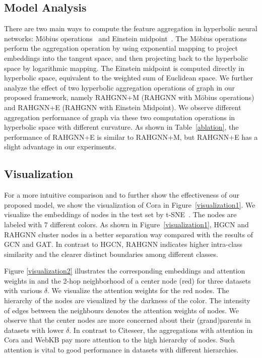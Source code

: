 \subsection{Model Analysis}
There are two main ways to compute the feature aggregation in hyperbolic neural networks: Möbius operations~\cite{HNN:GaneaBH18,HGCN_ChamiYRL19} and Einstein midpoint~\cite{HAtt}. 
The Möbius operations perform the aggregation operation by using exponential mapping to project embeddings into the tangent space, and then projecting back to the hyperbolic space by logarithmic mapping. 
The Einstein midpoint is computed directly in hyperbolic space, equivalent to the weighted sum of Euclidean space. 
We further analyze the effect of two hyperbolic aggregation operations of graph in our proposed framework, namely RAHGNN+M (RAHGNN with Möbius operations) and RAHGNN+E (RAHGNN with Einstein Midpoint). 
We observe different aggregation performance of graph via these two computation operations in hyperbolic space with different curvature.
As shown in Table~\ref{ablation}, the performance of RAHGNN+E is similar to RAHGNN+M, but RAHGNN+E has a slight advantage in our experiments. 



\subsection{Visualization}
For a more intuitive comparison and to further show the effectiveness of our proposed model, we show the visualization of Cora in Figure~\ref{visualization1}. 
We visualize the embeddings of nodes in the test set by t-SNE~\cite{van2008visualizing}. The nodes are labeled with 7 different colors. 
As shown in Figure~\ref{visualization1}, HGCN and RAHGNN cluster nodes in a better separation way compared with the results of GCN and GAT. 
In contrast to HGCN, RAHGNN indicates higher intra-class similarity and the clearer distinct boundaries among different classes. 

Figure \ref{visualization2} illustrates the corresponding embeddings and attention weights in and the 2-hop neighborhood of a center node (red) for three datasets with various $\delta$. 
We visualize the attention weights for the red nodes. 
The hierarchy of the nodes are visualized by the darkness of the color. 
The intensity of edges between the neighbours denotes the attention weights of nodes. 
We observe that the center nodes are more concerned about their (grand)parents in datasets with lower $\delta$. 
In contrast to Citeseer, the aggregations with attention in Cora and WebKB pay more attention to the high hierarchy of nodes. 
Such attention is vital to good performance in datasets with different hierarchies.
